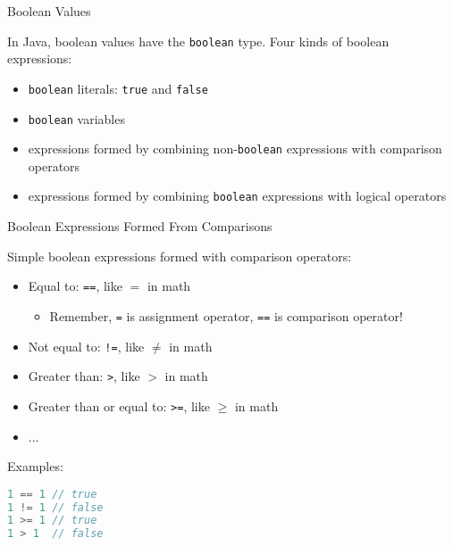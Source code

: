 \documentclass{beamer}
\begin{document}
\begin{frame}[fragile]{Boolean Values}


In Java, boolean values have the {\tt boolean} type.  Four kinds of boolean expressions:
\begin{itemize}
\item {\tt boolean} literals: {\tt true} and {\tt false}
\item {\tt boolean} variables
\item expressions formed by combining non-{\tt boolean} expressions with comparison operators
\item expressions formed by combining {\tt boolean} expressions with logical operators
\end{itemize}


\end{frame}


\begin{frame}[fragile]{Boolean Expressions Formed From Comparisons}


Simple boolean expressions formed with comparison operators:
\begin{itemize}
\item Equal to: {\tt ==}, like $=$ in math
  \begin{itemize}
    \item Remember, {\tt =} is assignment operator, {\tt ==} is comparison operator!
  \end{itemize}
\item Not equal to: {\tt !=}, like $\ne$ in math
\item Greater than: {\tt >}, like $>$ in math
\item Greater than or equal to: {\tt >=}, like $\ge$ in math
\item ...
\end{itemize}
Examples:
\begin{lstlisting}[language=Java]
1 == 1 // true
1 != 1 // false
1 >= 1 // true
1 > 1  // false
\end{lstlisting}

\end{frame}
\end{document}
